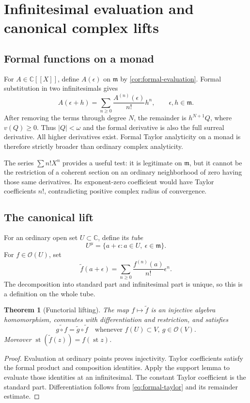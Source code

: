 \documentclass[11pt,oneside]{article}
\numberwithin{equation}{section}
\newtheorem{theorem}{Theorem}[section]
\theoremstyle{definition}
\theoremstyle{remark}\newtheorem{remark}[theorem]{Remark}
\newcommand{\C}{\mathbb C}
\newcommand{\OO}{\mathcal O}
\newcommand{\m}{\mathfrak m}
\newcommand{\st}{\operatorname{st}}
\begin{document}
\section{Infinitesimal evaluation and canonical complex lifts}
\subsection{Formal functions on a monad}
For $A\in\C[[X]]$, define $A(\epsilon)$ on $\m$ by
\cref{cor:formal-evaluation}. Formal substitution in two infinitesimals
gives
\begin{equation}\label{eq:formal-taylor}
 A(\epsilon+h)=\sum_{n\geq0}\frac{A^{(n)}(\epsilon)}{n!}h^n,
 \qquad \epsilon,h\in\m.
\end{equation}
After removing the terms through degree $N$, the remainder is
$h^{N+1}Q$, where $v(Q)\geq0$. Thus $|Q|<\omega$ and the formal
derivative is also the full surreal derivative. All higher derivatives
exist. Formal Taylor analyticity on a monad is therefore strictly broader
than ordinary complex analyticity.

The series $\sum n!X^n$ provides a useful test: it is legitimate on $\m$,
but it cannot be the restriction of a coherent section on an ordinary
neighborhood of zero having those same derivatives. Its exponent-zero
coefficient would have Taylor coefficients $n!$, contradicting positive
complex radius of convergence.

\subsection{The canonical lift}
For an ordinary open set $U\subset\C$, define its \emph{tube}
\[
 U^\mu=\{a+\epsilon:a\in U,\ \epsilon\in\m\}.
\]
For $f\in\OO(U)$, set
\begin{equation}\label{eq:lift}
 \widetilde f(a+\epsilon)
   =\sum_{n\geq0}\frac{f^{(n)}(a)}{n!}\epsilon^n.
\end{equation}
The decomposition into standard part and infinitesimal part is unique,
so this is a definition on the whole tube.

\begin{theorem}[Functorial lifting]\label{thm:lift}
The map $f\mapsto\widetilde f$ is an injective algebra homomorphism,
commutes with differentiation and restriction, and satisfies
\[
 \widetilde{g\circ f}=\widetilde g\circ\widetilde f
 \quad\text{whenever }f(U)\subset V,\ g\in\OO(V).
\]
Moreover $\st(\widetilde f(z))=f(\st z)$.
\end{theorem}
\begin{proof}
Evaluation at ordinary points proves injectivity. Taylor coefficients
satisfy the formal product and composition identities. Apply the support
lemma to evaluate those identities at an infinitesimal. The constant
Taylor coefficient is the standard part. Differentiation follows from
\eqref{eq:formal-taylor} and its remainder estimate.
\end{proof}
\end{document}
